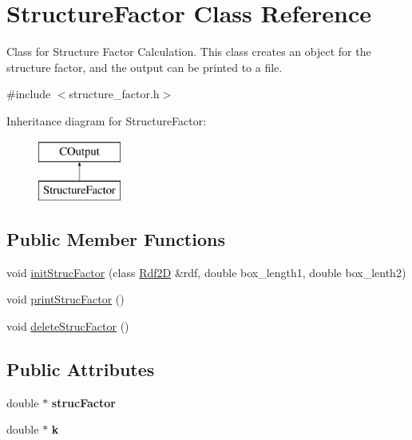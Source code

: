 \hypertarget{classStructureFactor}{}\section{Structure\+Factor Class Reference}
\label{classStructureFactor}


Class for Structure Factor Calculation. This class creates an object for the structure factor, and the output can be printed to a file.  




{\ttfamily \#include $<$structure\+\_\+factor.\+h$>$}

Inheritance diagram for Structure\+Factor\+:\begin{figure}[H]
\begin{center}
\leavevmode
\includegraphics[height=2.000000cm]{classStructureFactor}
\end{center}
\end{figure}
\subsection*{Public Member Functions}
\begin{DoxyCompactItemize}
\item 
void \mbox{\hyperlink{classStructureFactor_aa1afd82ced049c30b19ad13227301d25}{init\+Struc\+Factor}} (class \mbox{\hyperlink{classRdf2D}{Rdf2D}} \&rdf, double box\+\_\+length1, double box\+\_\+lenth2)
\item 
void \mbox{\hyperlink{classStructureFactor_a5b3f1a43405ec79bc8de4075da1316fa}{print\+Struc\+Factor}} ()
\item 
void \mbox{\hyperlink{classStructureFactor_a0ac46fa427372d9b110f9f9657424803}{delete\+Struc\+Factor}} ()
\end{DoxyCompactItemize}
\subsection*{Public Attributes}
\begin{DoxyCompactItemize}
\item 
\mbox{\label{classStructureFactor_a71f225514b29540ac42850e7a478cb5e}} 
double $\ast$ {\bfseries struc\+Factor}
\item 
\mbox{\label{classStructureFactor_a30b23e2b8b092f032dd06a4506d78df1}} 
double $\ast$ {\bfseries k}
\end{DoxyCompactItemize}


